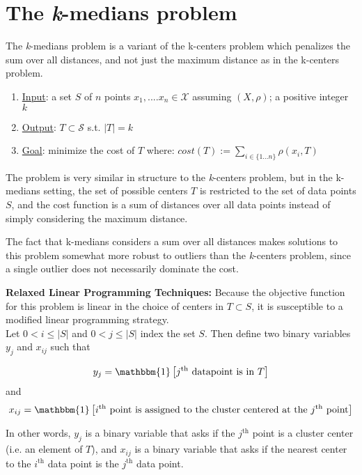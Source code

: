 \section{The \emph{k}-medians problem}
The \emph{k}-medians problem is a variant of the k-centers problem 
which penalizes the sum over all distances, and not just the maximum distance
as in the k-centers problem.

\begin{enumerate}
\item \underline{Input}: a set $S$ of $n$ points $x_1,....x_n \in 
\mathcal{X}$ assuming $(X,\rho)$; a positive integer $k$ 
\item \underline{Output}: $T \subset \mathcal{S}$ s.t. $|T| = k$
\item \underline{Goal}: minimize the cost of $T$ where: $ cost(T)
:= \sum_{i \in \{1...n\}} \rho(x_i,T) $
\end{enumerate}

The problem is very similar in structure to the \emph{k}-centers problem,
but in the k-medians setting, the set of possible centers $T$ is restricted to the set of data points $S$,
and the cost function is a sum of distances over all data points instead of simply considering the maximum distance. 

\begin{remark}
The fact that k-medians considers a sum over all distances makes solutions to
this problem somewhat more robust to outliers than the \emph{k}-centers problem,
since a single outlier does not necessarily dominate the cost.
\end{remark}

\noindent\textbf{Relaxed Linear Programming Techniques:} Because the objective function for this problem is linear in the choice of
centers in $T\subset S$, it is susceptible to a modified linear programming strategy.\\

Let $0< i\leq |S|$ and $0 < j\leq |S|$ index the set $S$. Then define two
binary variables $y_j$ and $x_{ij}$ such that

$$y_j = \mathbbm{1}\left[j^\text{th}\text{ datapoint is in } T\right]$$
and
$$x_{ij} = \mathbbm{1}\left[i^\text{th} \text{ point is assigned to the cluster centered at the }j^\text{th} \text{ point}\right]$$

In other words, $y_j$ is a binary variable that asks if the 
$j^\text{th}$ point is a cluster center (i.e. an element of $T$), 
and $x_{ij}$ is a binary variable that asks if the nearest center to
the $i^\text{th}$ data point is the $j^\text{th}$ data point.

